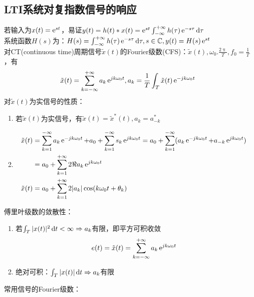 \documentclass{article}
\begin{document}
\subsection{LTI系统对复指数信号的响应}
若输入为$x(t) = \operatorname{e}^{st}$，易证$y(t) = h(t)*x(t) = \operatorname{e}^{st}\int_{-\infty}^{+\infty}h(\tau)\operatorname{e}^{-s\tau}\mathop{}\!\mathrm{d}\tau$\\
系统函数$H(s)$为：$H(s) = \int_{-\infty}^{+\infty}h(\tau)\operatorname{e}^{-s\tau}\mathop{}\!\mathrm{d}\tau,s\in\mathbb{C},y(t) = H(s)\operatorname{e}^{st}$\\
对CT(continuous time)周期信号$\tilde{x}(t)$的Fourier级数(CFS)：$\tilde{x}(t),\omega_0 .\frac{2\uppi}{T},f_0 = \frac{1}{T}$，有
\[\tilde{x}(t) = \sum_{k=-\infty}^{+\infty}a_{k}\operatorname{e}^{jk\omega_0t},a_{k} = \frac{1}{T}\int_{T}\tilde{x}(t)\operatorname{e}^{-jk\omega_0t}\]
对$\tilde{x}(t)$为实信号的性质：
\begin{enumerate}[label=(\arabic*)]
	\item 若$\tilde{x}(t)$为实信号，有$\tilde{x}(t)=\tilde{x}^{*}(t),a_{k}=a_{-k}^{*}$
	\item \[\begin{aligned}
					\tilde{x}(t) &= \sum_{k=1}^{-\infty}a_k\operatorname{e}^{-jk\omega_0t}+a_0+\sum_{k=1}^{-\infty}s_k\operatorname{e}^{jk\omega_0t} = a_0+\sum_{k=1}^{-\infty}(a_{k}\operatorname{e}^{-jk\omega_0t}+a_{-k}\operatorname{e}^{jk\omega_0t}) \\
					&= a_0+\sum_{k=1}^{+\infty}2\Re{a_{k}\operatorname{e}^{jk\omega_0t}}\\
					\tilde{x}(t) &= a_0+\sum_{k=1}^{+\infty}2|a_{k}|\cos (k\omega_0t+\theta_k)
				\end{aligned}\]
\end{enumerate}
傅里叶级数的敛散性：
\begin{enumerate}[label=(\arabic*)]
	\item 若$\int_{T}|x(t)|^2\mathop{}\!\mathrm{d} t<\infty\Rightarrow a_{k}$有限，即平方可积收敛
				\[e(t) = \tilde{x}(t) = \sum_{k=-\infty}^{+\infty}a_{k}\operatorname{e}^{jk\omega_0t}\]
	\item 绝对可积：$\int_{T}|x(t)|\mathop{}\!\mathrm{d} t\Rightarrow a_{k}$有限
\end{enumerate}
常用信号的Fourier级数：
\end{document}
